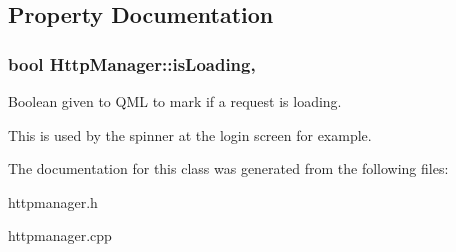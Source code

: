 \subsection{Property Documentation}
\hypertarget{classHttpManager_aa2f331facd6aeaff68c6f424f10bbce5}{
\subsubsection[{is\-Loading}]{\setlength{\rightskip}{0pt plus 5cm}bool Http\-Manager\-::is\-Loading\hspace{0.3cm}{\ttfamily [read]}, {\ttfamily [write]}}}\label{classHttpManager_aa2f331facd6aeaff68c6f424f10bbce5}


Boolean given to Q\-M\-L to mark if a request is loading. 

This is used by the spinner at the login screen for example. 

The documentation for this class was generated from the following files\-:\begin{DoxyCompactItemize}
\item 
httpmanager.\-h\item 
httpmanager.\-cpp\end{DoxyCompactItemize}
